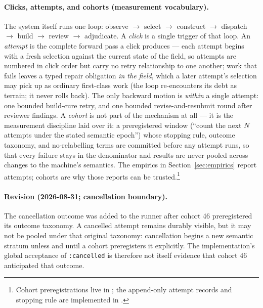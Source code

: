 \paragraph{Clicks, attempts, and cohorts (measurement vocabulary).} The system itself runs one loop: observe $\to$ select $\to$ construct $\to$ dispatch $\to$ build $\to$ review $\to$ adjudicate.  A \emph{click} is a single trigger of that loop.  An \emph{attempt} is the complete forward pass a click produces --- each attempt begins with a fresh selection against the current state of the field, so attempts are numbered in click order but carry no retry relationship to one another; work that fails leaves a typed repair obligation \emph{in the field}, which a later attempt's selection may pick up as ordinary first-class work (the loop re-encounters its debt as terrain; it never rolls back).  The only backward motion is \emph{within} a single attempt: one bounded build-cure retry, and one bounded revise-and-resubmit round after reviewer findings.  A \emph{cohort} is not part of the mechanism at all --- it is the measurement discipline laid over it: a preregistered window (``count the next $N$ attempts under the stated semantic epoch'') whose stopping rule, outcome taxonomy, and no-relabelling terms are committed before any attempt runs, so that every failure stays in the denominator and results are never pooled across changes to the machine's semantics.  The empirics in Section~\ref{sec:empirics} report attempts; cohorts are why those reports can be trusted.\footnote{Cohort preregistrations live in ; the append-only attempt records and stopping rule are implemented in .}

\paragraph{Revision (2026-08-31; cancellation boundary).} The cancellation outcome was added to the runner after cohort 46 preregistered its outcome taxonomy.  A cancelled attempt remains durably visible, but it may not be pooled under that original taxonomy: cancellation begins a new semantic stratum unless and until a cohort preregisters it explicitly.  The implementation's global acceptance of \texttt{:cancelled} is therefore not itself evidence that cohort 46 anticipated that outcome.

